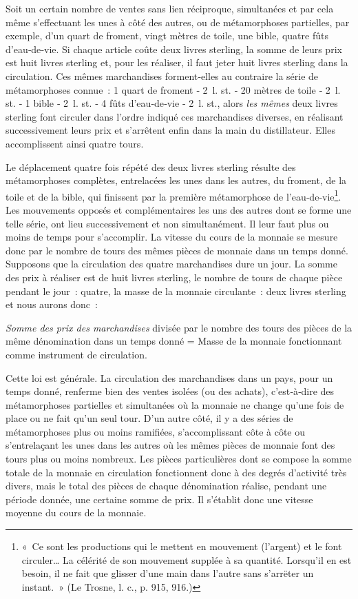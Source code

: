\documentclass[french,twoside]{book} %
\begin{document}
Soit un certain nombre de ventes sans lien réciproque, simultanées et par cela même s’effectuant les unes à côté des autres, ou de métamorphoses partielles, par exemple, d’un quart de froment, vingt mètres de toile, une bible, quatre fûts d’eau‑de‑vie. Si chaque article coûte deux livres sterling, la somme de leurs prix est huit livres sterling et, pour les réaliser, il faut jeter huit livres sterling dans la circulation. Ces mêmes marchandises forment‑elles au contraire la série de métamorphoses connue : 1 quart de froment ‑ 2 l. st. ‑ 20 mètres de toile ‑ 2 l. st. ‑ 1 bible ‑ 2 l. st. ‑ 4 fûts d’eau‑de‑vie ‑ 2 l. st., alors \emph{les mêmes} deux livres sterling font circuler dans l’ordre indiqué ces marchandises diverses, en réalisant successivement leurs prix et s’arrêtent enfin dans la main du distillateur. Elles accomplissent ainsi quatre tours.\par
Le déplacement quatre fois répété des deux livres sterling résulte des métamorphoses complètes, entrelacées les unes dans les autres, du froment, de la toile et de la bible, qui finissent par la première métamorphose de l’eau‑de‑vie\footnote{« Ce sont les productions qui le mettent en mouvement (l’argent) et le font circuler… La célérité de son mouvement supplée à sa quantité. Lorsqu’il en est besoin, il ne fait que glisser d’une main dans l’autre sans s’arrëter un instant. » (Le Trosne, l. c., p. 915, 916.)}. Les mouvements opposés et complémentaires les uns des autres dont se forme une telle série, ont lieu successivement et non simultanément. Il leur faut plus ou moins de temps pour s’accomplir. La vitesse du cours de la monnaie se mesure donc par le nombre de tours des mêmes pièces de monnaie dans un temps donné. Supposons que la circulation des quatre marchandises dure un jour. La somme des prix à réaliser est de huit livres sterling, le nombre de tours de chaque pièce pendant le jour : quatre, la masse de la monnaie circulante : deux livres sterling et nous aurons donc :\par
\emph{Somme des prix des marchandises} divisée par le nombre des tours des pièces de la même dénomination dans un temps donné = Masse de la monnaie fonctionnant comme instrument de circulation.\par
Cette loi est générale. La circulation des marchandises dans un pays, pour un temps donné, renferme bien des ventes isolées (ou des achats), c’est‑à‑dire des métamorphoses partielles et simultanées où la monnaie ne change qu’une fois de place ou ne fait qu’un seul tour. D’un autre côté, il y a des séries de métamorphoses plus ou moins ramifiées, s’accomplissant côte à côte ou s’entrelaçant les unes dans les autres où les mêmes pièces de monnaie font des tours plus ou moins nombreux. Les pièces particulières dont se compose la somme totale de la monnaie en circulation fonctionnent donc à des degrés d’activité très divers, mais le total des pièces de chaque dénomination réalise, pendant une période donnée, une certaine somme de prix. Il s’établit donc une vitesse moyenne du cours de la monnaie.\par
\end{document}
